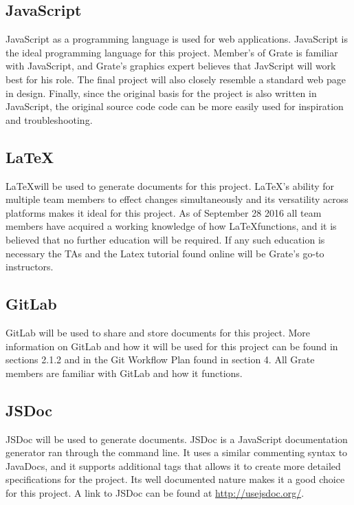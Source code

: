 \documentclass{article}
\begin{document}
\subsection{JavaScript}

JavaScript as a programming language is used for web applications. JavaScript is 
the ideal programming language for this project. Member's of Grate is familiar 
with JavaScript, and \textcolor{RoyalPurple}{Grate's} graphics 
expert believes that JavScript will work best for his role. The final project 
will also closely 
resemble a standard web page in design. Finally, since the original basis for 
the 
project is also written in JavaScript, the original source code code can be more 
easily used for 
inspiration and troubleshooting.

\subsection{\LaTeX}

\LaTeX will be used to generate documents for this project. \LaTeX's ability for 
multiple team members to effect changes simultaneously and its versatility 
across platforms makes it ideal for this project. As of September 28 2016 all 
team members have acquired a working knowledge of how \LaTeX functions, and it 
is 
believed that no further education will be required. If any such education is 
necessary the TAs and the Latex tutorial found online will be \textcolor{RoyalPurple}{Grate's} go-to 
instructors. 

\subsection{GitLab}

GitLab will be used to share and store documents for this project. More 
information on GitLab and how it will be used for this project can be found in 
sections 2.1.2 and in the Git Workflow Plan found in section 4. All Grate 
members are familiar with GitLab and how it functions. 

\subsection{JSDoc}
\textcolor{RoyalPurple}{JSDoc will be used to generate documents. JSDoc is a JavaScript documentation 
generator ran through the command line. It uses a similar commenting syntax to JavaDocs, and it supports additional tags that allows it to create more detailed specifications for the project. Its well documented nature 
makes it a good choice for this project. A link to JSDoc can be found at
\url{http://usejsdoc.org/}.}
\end{document}

